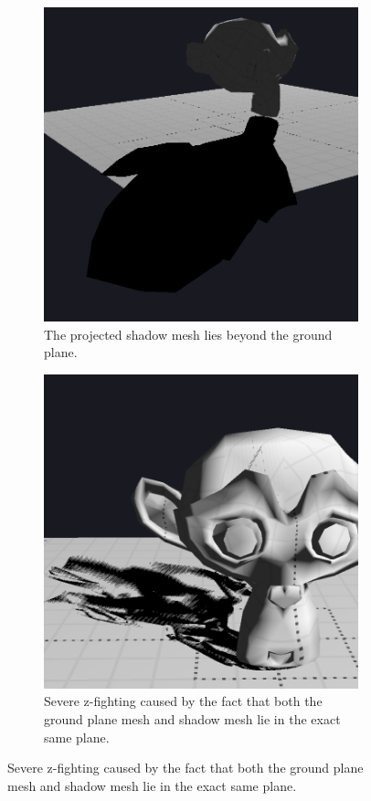 \begin{figure}[h]
    \centering
    \begin{subfigure}[t]{0.45\textwidth}
		\centering
        \includegraphics[width=\textwidth]{./graf/projection_shadow_beyond.png}
        \caption{The projected shadow mesh lies beyond the ground plane.}
        \label{fig:projection_shadow_beyond}
    \end{subfigure}
	\hfill
    \begin{subfigure}[t]{0.45\textwidth}
		\centering
        \includegraphics[width=\textwidth]{./graf/projection_shadow_fighting.png}
        \caption{Severe z-fighting caused by the fact that both the ground plane mesh and shadow mesh lie in the exact same plane.}
        \label{fig:projection_shadow_fighting}
    \end{subfigure}


\end{figure}
